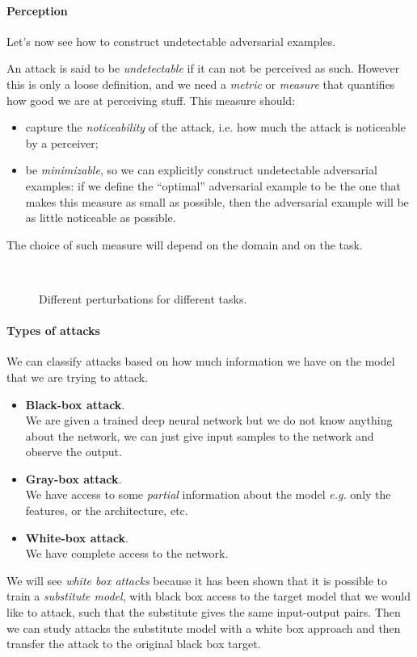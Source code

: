 \paragraph{Perception}
Let's now see how to construct undetectable adversarial examples.

An attack is said to be \emph{undetectable} if it can not be perceived as such. However this is only a loose definition, and we need a \emph{metric} or \emph{measure} that quantifies how good we are at perceiving stuff. This measure should:
\begin{itemize}
	\item capture the \emph{noticeability} of the attack, i.e. how much the attack is noticeable by a perceiver;
	\item be \emph{minimizable}, so we can explicitly construct undetectable adversarial examples: if we define the ``optimal'' adversarial example to be the one that makes this measure as small as possible, then the adversarial example will be as little noticeable as possible.
\end{itemize}

The choice of such measure will depend on the domain and on the task. 

\begin{figure}[H]
	\centering
	 \\
	\caption{Different perturbations for different tasks.}
\end{figure}

\paragraph{Types of attacks}

We can classify attacks based on how much information we have on the model that we are trying to attack.
\begin{itemize}
    \item \textbf{Black-box attack}. \\
    We are given a trained deep neural network but we do not know anything about the network, we can just give input samples to the network and observe the output.
    \item \textbf{Gray-box attack}. \\ 
    We have access to some \emph{partial} information about the model \textit{e.g.} only the features, or the architecture, etc.
    \item \textbf{White-box attack}. \\ 
    We have complete access to the network.
\end{itemize}
We will see \emph{white box attacks} because it has been shown that it is possible to train a \emph{substitute model}, with black box access to the target model that we would like to attack, such that the substitute gives the same input-output pairs. Then we can study attacks the substitute model with a white box approach and then transfer the attack to the original black box target.
\\

